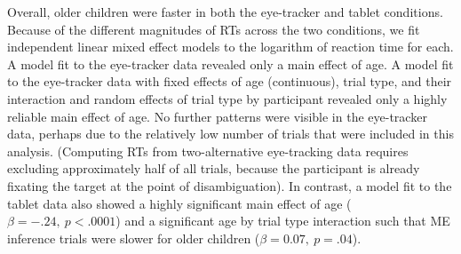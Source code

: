 \documentclass[man,noapacite]{apa2}
\begin{document}
Overall, older children were faster in both the eye-tracker and tablet conditions. Because of the different magnitudes of RTs across the two conditions, we fit independent linear mixed effect models to the logarithm of reaction time for each. A model fit to the eye-tracker data revealed only a main effect of age. A model fit to the eye-tracker data with fixed effects of age (continuous), trial type, and their interaction and random effects of trial type by participant revealed only a highly reliable main effect of age. No further patterns were visible in the eye-tracker data, perhaps due to the relatively low number of trials that were included in this analysis. (Computing RTs from two-alternative eye-tracking data requires excluding approximately half of all trials, because the participant is already fixating the target at the point of disambiguation). In contrast, a model fit to the tablet data also showed a highly significant main effect of age ($\beta=-.24,~p < .0001$) and a significant age by trial type interaction such that ME inference trials were slower for older children ($\beta = 0.07,~p =.04$).
\end{document}

